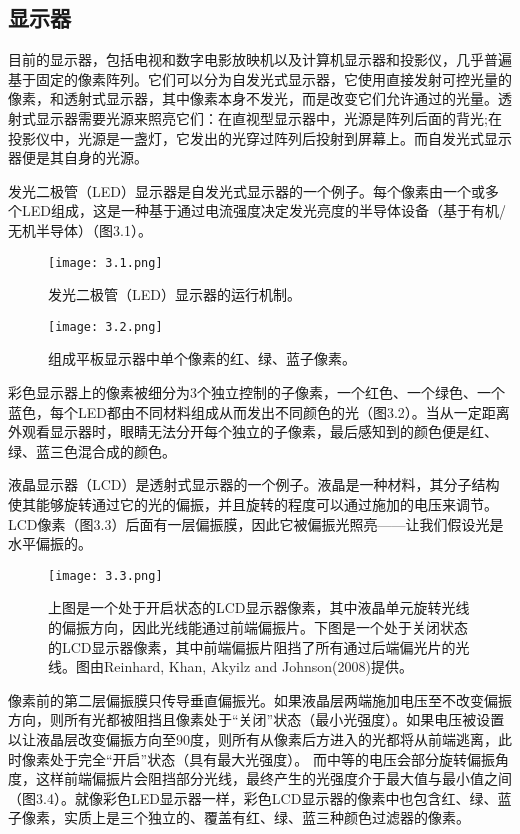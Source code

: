 \documentclass[lang=cn,12pt]{elegantbook}
\begin{document}
\subsection{显示器}

目前的显示器，包括电视和数字电影放映机以及计算机显示器和投影仪，几乎普遍基于固定的像素阵列。它们可以分为自发光式显示器，它使用直接发射可控光量的像素，和透射式显示器，其中像素本身不发光，而是改变它们允许通过的光量。透射式显示器需要光源来照亮它们：在直视型显示器中，光源是阵列后面的背光;在投影仪中，光源是一盏灯，它发出的光穿过阵列后投射到屏幕上。而自发光式显示器便是其自身的光源。

发光二极管（LED）显示器是自发光式显示器的一个例子。每个像素由一个或多个LED组成，这是一种基于通过电流强度决定发光亮度的半导体设备（基于有机/无机半导体）（图3.1）。

\begin{figure}[htb]
\centering
\begin{minipage}[t]{0.45\textwidth}
\centering
\texttt{[image: 3.1.png]}
\caption{发光二极管（LED）显示器的运行机制。}
\end{minipage}
\begin{minipage}[t]{0.45\textwidth}
\centering
\texttt{[image: 3.2.png]}
\caption{组成平板显示器中单个像素的红、绿、蓝子像素。}
\end{minipage}
\end{figure}

彩色显示器上的像素被细分为3个独立控制的子像素，一个红色、一个绿色、一个蓝色，每个LED都由不同材料组成从而发出不同颜色的光（图3.2）。当从一定距离外观看显示器时，眼睛无法分开每个独立的子像素，最后感知到的颜色便是红、绿、蓝三色混合成的颜色。

液晶显示器（LCD）是透射式显示器的一个例子。液晶是一种材料，其分子结构使其能够旋转通过它的光的偏振，并且旋转的程度可以通过施加的电压来调节。LCD像素（图3.3）后面有一层偏振膜，因此它被偏振光照亮——让我们假设光是水平偏振的。

\begin{figure}[htb]
\centering
\texttt{[image: 3.3.png]}
\caption{上图是一个处于开启状态的LCD显示器像素，其中液晶单元旋转光线的偏振方向，因此光线能通过前端偏振片。下图是一个处于关闭状态的LCD显示器像素，其中前端偏振片阻挡了所有通过后端偏光片的光线。图由Reinhard, Khan, Akyilz and Johnson(2008)提供。}
\end{figure}

像素前的第二层偏振膜只传导垂直偏振光。如果液晶层两端施加电压至不改变偏振方向，则所有光都被阻挡且像素处于“关闭”状态（最小光强度）。如果电压被设置以让液晶层改变偏振方向至90度，则所有从像素后方进入的光都将从前端逃离，此时像素处于完全“开启”状态（具有最大光强度）。 而中等的电压会部分旋转偏振角度，这样前端偏振片会阻挡部分光线，最终产生的光强度介于最大值与最小值之间（图3.4）。就像彩色LED显示器一样，彩色LCD显示器的像素中也包含红、绿、蓝子像素，实质上是三个独立的、覆盖有红、绿、蓝三种颜色过滤器的像素。
\end{document}
